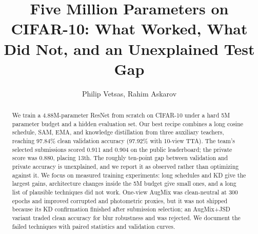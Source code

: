 \documentclass[letterpaper]{article}
\title{Five Million Parameters on CIFAR-10: What Worked, What Did Not, and an Unexplained Test Gap}
\author{
  Philip Vetsas,
  Rahim Askarov
}
\begin{document}
\maketitle

\begin{abstract}
We train a 4.88M-parameter ResNet from scratch on CIFAR-10 under a hard 5M
parameter budget and a hidden evaluation set. Our best recipe combines a long
cosine schedule, SAM, EMA, and knowledge distillation from three auxiliary
teachers, reaching 97.84\% clean validation accuracy (97.92\% with 10-view TTA).
The team's selected submissions scored 0.911 and 0.904 on the public leaderboard;
the private score was 0.880, placing 13th. The roughly ten-point gap between
validation and private accuracy is unexplained, and we report it as observed
rather than optimizing against it. We focus on measured training experiments:
long schedules and KD give the largest gains, architecture changes inside the 5M
budget give small ones, and a long list of plausible techniques did not work.
One-view AugMix was clean-neutral at 300 epochs and improved corrupted and
photometric proxies, but it was not shipped because its KD confirmation finished
after submission selection; an AugMix+JSD variant traded clean accuracy for blur
robustness and was rejected. We document the failed techniques with paired
statistics and validation curves.
\end{abstract}









\end{document}

